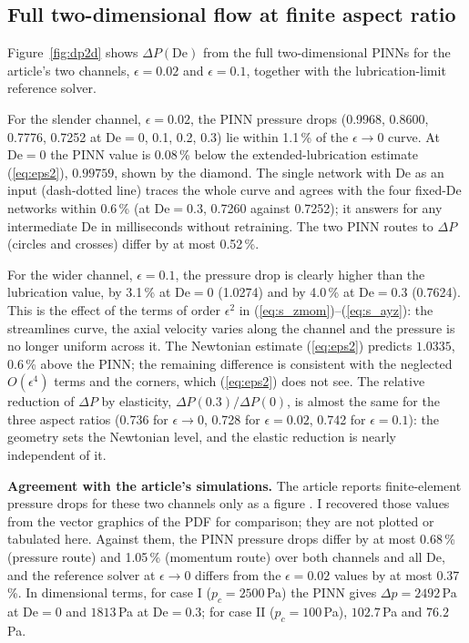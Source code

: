\documentclass[11pt,a4paper]{article}
\newcommand{\De}{\mathrm{De}}
\begin{document}
\subsection{Full two-dimensional flow at finite aspect ratio}
Figure~\ref{fig:dp2d} shows $\Delta P(\De)$ from the full two-dimensional PINNs for the article's two channels, $\epsilon=0.02$ and $\epsilon=0.1$, together with the lubrication-limit reference solver.

For the slender channel, $\epsilon=0.02$, the PINN pressure drops (0.9968, 0.8600, 0.7776, 0.7252 at $\De=0$, 0.1, 0.2, 0.3) lie within 1.1\,\% of the $\epsilon\to0$ curve. At $\De=0$ the PINN value is 0.08\,\% below the extended-lubrication estimate (\ref{eq:eps2}), $0.99759$, shown by the diamond. The single network with $\De$ as an input (dash-dotted line) traces the whole curve and agrees with the four fixed-$\De$ networks within 0.6\,\% (at $\De=0.3$, 0.7260 against 0.7252); it answers for any intermediate $\De$ in milliseconds without retraining. The two PINN routes to $\Delta P$ (circles and crosses) differ by at most 0.52\,\%.

For the wider channel, $\epsilon=0.1$, the pressure drop is clearly higher than the lubrication value, by 3.1\,\% at $\De=0$ (1.0274) and by 4.0\,\% at $\De=0.3$ (0.7624). This is the effect of the terms of order $\epsilon^2$ in (\ref{eq:s_zmom})--(\ref{eq:s_ayz}): the streamlines curve, the axial velocity varies along the channel and the pressure is no longer uniform across it. The Newtonian estimate (\ref{eq:eps2}) predicts $1.0335$, 0.6\,\% above the PINN; the remaining difference is consistent with the neglected $O(\epsilon^4)$ terms and the corners, which (\ref{eq:eps2}) does not see. The relative reduction of $\Delta P$ by elasticity, $\Delta P(0.3)/\Delta P(0)$, is almost the same for the three aspect ratios (0.736 for $\epsilon\to0$, 0.728 for $\epsilon=0.02$, 0.742 for $\epsilon=0.1$): the geometry sets the Newtonian level, and the elastic reduction is nearly independent of it.

\textbf{Agreement with the article's simulations.} The article reports finite-element pressure drops for these two channels only as a figure \cite[fig.~2]{boyko2022}. I recovered those values from the vector graphics of the PDF for comparison; they are not plotted or tabulated here. Against them, the PINN pressure drops differ by at most 0.68\,\% (pressure route) and 1.05\,\% (momentum route) over both channels and all $\De$, and the reference solver at $\epsilon\to0$ differs from the $\epsilon=0.02$ values by at most 0.37\,\%. In dimensional terms, for case I ($p_c=2500$\,Pa) the PINN gives $\Delta p=2492$\,Pa at $\De=0$ and $1813$\,Pa at $\De=0.3$; for case II ($p_c=100$\,Pa), $102.7$\,Pa and $76.2$\,Pa.
\end{document}
